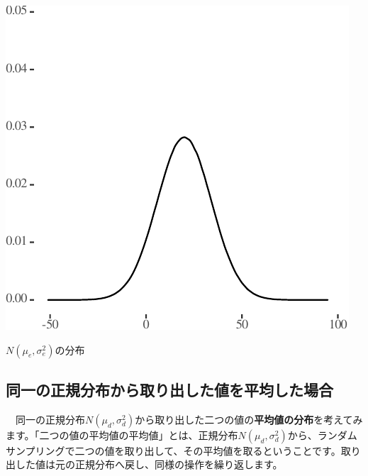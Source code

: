 \documentclass[a4paper]{tufte-handout}
\begin{document}
\begin{marginfigure}

{\centering \includegraphics{AdditivityOfVariance_files/figure-latex/unnamed-chunk-9-1} 

}

\caption[$N(\mu_e, \sigma^2_e)$の分布]{$N(\mu_e, \sigma^2_e)$の分布}\label{fig:unnamed-chunk-9}
\end{marginfigure}

\newpage

\hypertarget{ux540cux4e00ux306eux6b63ux898fux5206ux5e03ux304bux3089ux53d6ux308aux51faux3057ux305fux5024ux3092ux5e73ux5747ux3057ux305fux5834ux5408}{%
\subsection{\texorpdfstring{\textbf{同一の正規分布から取り出した値を平均した場合}}{同一の正規分布から取り出した値を平均した場合}}\label{ux540cux4e00ux306eux6b63ux898fux5206ux5e03ux304bux3089ux53d6ux308aux51faux3057ux305fux5024ux3092ux5e73ux5747ux3057ux305fux5834ux5408}}

　同一の正規分布\(N(\mu_d, \sigma^2_d)\)から取り出した二つの値の\textbf{平均値の分布}を考えてみます。「二つの値の平均値の平均値」とは、正規分布\(N(\mu_d, \sigma^2_d)\)から、ランダムサンプリングで二つの値を取り出して、その平均値を取るということです。取り出した値は元の正規分布へ戻し、同様の操作を繰り返します。
\end{document}
